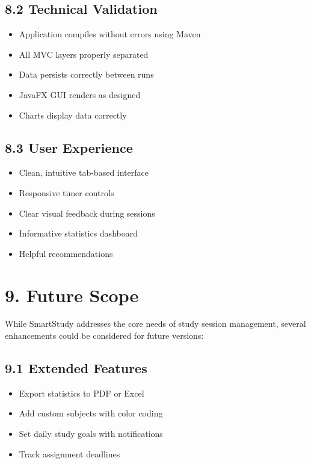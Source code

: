 \documentclass[12pt,a4paper]{article}
\begin{document}
\subsection{8.2 Technical Validation}

\begin{itemize}
    \item Application compiles without errors using Maven
    \item All MVC layers properly separated
    \item Data persists correctly between runs
    \item JavaFX GUI renders as designed
    \item Charts display data correctly
\end{itemize}

\subsection{8.3 User Experience}

\begin{itemize}
    \item Clean, intuitive tab-based interface
    \item Responsive timer controls
    \item Clear visual feedback during sessions
    \item Informative statistics dashboard
    \item Helpful recommendations
\end{itemize}

\section{9. Future Scope}

While SmartStudy addresses the core needs of study session management, several enhancements could be considered for future versions:

\subsection{9.1 Extended Features}
\begin{itemize}
    \item Export statistics to PDF or Excel
    \item Add custom subjects with color coding
    \item Set daily study goals with notifications
    \item Track assignment deadlines
\end{itemize}
\end{document}

